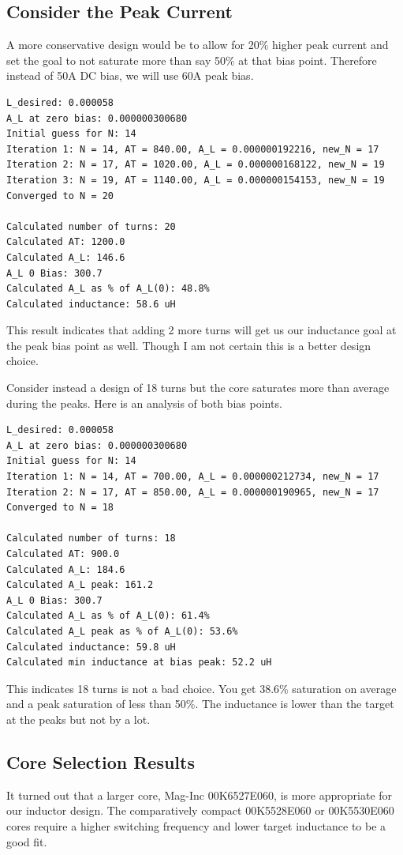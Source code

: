 \documentclass{article}
\begin{document}
\subsection{Consider the Peak Current}

A more conservative design would be to allow for 20\% higher peak current and set the goal to not saturate more than say 50\% at that bias point.  Therefore instead of 50A DC bias, we will use 60A peak bias.

\begin{verbatim}
L_desired: 0.000058
A_L at zero bias: 0.000000300680
Initial guess for N: 14
Iteration 1: N = 14, AT = 840.00, A_L = 0.000000192216, new_N = 17
Iteration 2: N = 17, AT = 1020.00, A_L = 0.000000168122, new_N = 19
Iteration 3: N = 19, AT = 1140.00, A_L = 0.000000154153, new_N = 19
Converged to N = 20

Calculated number of turns: 20
Calculated AT: 1200.0
Calculated A_L: 146.6
A_L 0 Bias: 300.7
Calculated A_L as % of A_L(0): 48.8%
Calculated inductance: 58.6 uH
\end{verbatim}

This result indicates that adding 2 more turns will get us our inductance goal at the peak bias point as well.  Though I am not certain this is a better design choice.

Consider instead a design of 18 turns but the core saturates more than average during the peaks.  Here is an analysis of both bias points.

\begin{verbatim}
L_desired: 0.000058
A_L at zero bias: 0.000000300680
Initial guess for N: 14
Iteration 1: N = 14, AT = 700.00, A_L = 0.000000212734, new_N = 17
Iteration 2: N = 17, AT = 850.00, A_L = 0.000000190965, new_N = 17
Converged to N = 18

Calculated number of turns: 18
Calculated AT: 900.0
Calculated A_L: 184.6
Calculated A_L peak: 161.2
A_L 0 Bias: 300.7
Calculated A_L as % of A_L(0): 61.4%
Calculated A_L peak as % of A_L(0): 53.6%
Calculated inductance: 59.8 uH
Calculated min inductance at bias peak: 52.2 uH
\end{verbatim}

This indicates 18 turns is not a bad choice.  You get 38.6\% saturation on average and a peak saturation of less than 50\%.  The inductance is lower than the target at the peaks but not by a lot.

\subsection{Core Selection Results}
It turned out that a larger core, Mag-Inc 00K6527E060, is more appropriate for our inductor design.  The comparatively compact 00K5528E060 or 00K5530E060 cores require a higher switching frequency and lower target inductance to be a good fit.
\end{document}
